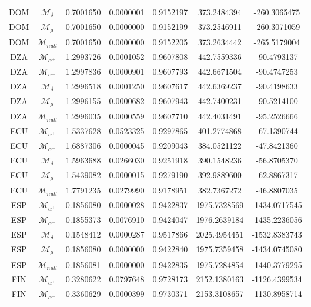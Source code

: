 \begin{tabular}{ccccccc}
DOM & $\mathcal{M}_{\delta}$ & 0.7001650 & 0.0000001 & 0.9152197 & 373.2484394 & -260.3065475\\
DOM & $\mathcal{M}_{\mu}$ & 0.7001650 & 0.0000000 & 0.9152199 & 373.2546911 & -260.3071059\\
DOM & $\mathcal{M}_{null}$ & 0.7001650 & 0.0000000 & 0.9152205 & 373.2634442 & -265.5179004\\
DZA & $\mathcal{M}_{\alpha^+}$ & 1.2993726 & 0.0001052 & 0.9607808 & 442.7559336 & -90.4793137\\
DZA & $\mathcal{M}_{\alpha^-}$ & 1.2997836 & 0.0000901 & 0.9607793 & 442.6671504 & -90.4747253\\
DZA & $\mathcal{M}_{\delta}$ & 1.2996518 & 0.0001250 & 0.9607617 & 442.6369237 & -90.4198633\\
DZA & $\mathcal{M}_{\mu}$ & 1.2996155 & 0.0000682 & 0.9607943 & 442.7400231 & -90.5214100\\
DZA & $\mathcal{M}_{null}$ & 1.2996035 & 0.0000559 & 0.9607710 & 442.4031491 & -95.2526666\\
ECU & $\mathcal{M}_{\alpha^+}$ & 1.5337628 & 0.0523325 & 0.9297865 & 401.2774868 & -67.1390744\\
ECU & $\mathcal{M}_{\alpha^-}$ & 1.6887306 & 0.0000045 & 0.9209043 & 384.0521122 & -47.8421360\\
ECU & $\mathcal{M}_{\delta}$ & 1.5963688 & 0.0266030 & 0.9251918 & 390.1548236 & -56.8705370\\
ECU & $\mathcal{M}_{\mu}$ & 1.5439082 & 0.0000015 & 0.9279190 & 392.9889600 & -62.8867317\\
ECU & $\mathcal{M}_{null}$ & 1.7791235 & 0.0279990 & 0.9178951 & 382.7367272 & -46.8807035\\
ESP & $\mathcal{M}_{\alpha^+}$ & 0.1856080 & 0.0000028 & 0.9422837 & 1975.7328569 & -1434.0717545\\
ESP & $\mathcal{M}_{\alpha^-}$ & 0.1855373 & 0.0076910 & 0.9424047 & 1976.2639184 & -1435.2236056\\
ESP & $\mathcal{M}_{\delta}$ & 0.1548412 & 0.0000287 & 0.9517866 & 2025.4954451 & -1532.8383743\\
ESP & $\mathcal{M}_{\mu}$ & 0.1856080 & 0.0000000 & 0.9422840 & 1975.7359458 & -1434.0745080\\
ESP & $\mathcal{M}_{null}$ & 0.1856081 & 0.0000000 & 0.9422835 & 1975.7284854 & -1440.3779295\\
FIN & $\mathcal{M}_{\alpha^+}$ & 0.3280622 & 0.0797648 & 0.9728173 & 2152.1380163 & -1126.4399534\\
FIN & $\mathcal{M}_{\alpha^-}$ & 0.3360629 & 0.0000399 & 0.9730371 & 2153.3108657 & -1130.8958714\\

\end{tabular}
